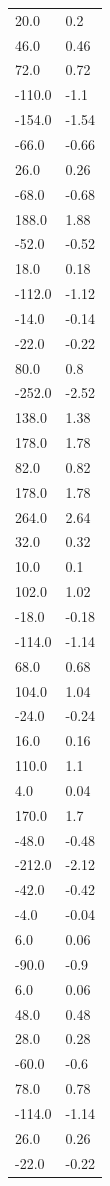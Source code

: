 \begin{longtable}{ll}
20.0 & 0.2 \\
46.0 & 0.46 \\
72.0 & 0.72 \\
-110.0 & -1.1 \\
-154.0 & -1.54 \\
-66.0 & -0.66 \\
26.0 & 0.26 \\
-68.0 & -0.68 \\
188.0 & 1.88 \\
-52.0 & -0.52 \\
18.0 & 0.18 \\
-112.0 & -1.12 \\
-14.0 & -0.14 \\
-22.0 & -0.22 \\
80.0 & 0.8 \\
-252.0 & -2.52 \\
138.0 & 1.38 \\
178.0 & 1.78 \\
82.0 & 0.82 \\
178.0 & 1.78 \\
264.0 & 2.64 \\
32.0 & 0.32 \\
10.0 & 0.1 \\
102.0 & 1.02 \\
-18.0 & -0.18 \\
-114.0 & -1.14 \\
68.0 & 0.68 \\
104.0 & 1.04 \\
-24.0 & -0.24 \\
16.0 & 0.16 \\
110.0 & 1.1 \\
4.0 & 0.04 \\
170.0 & 1.7 \\
-48.0 & -0.48 \\
-212.0 & -2.12 \\
-42.0 & -0.42 \\
-4.0 & -0.04 \\
6.0 & 0.06 \\
-90.0 & -0.9 \\
6.0 & 0.06 \\
48.0 & 0.48 \\
28.0 & 0.28 \\
-60.0 & -0.6 \\
78.0 & 0.78 \\
-114.0 & -1.14 \\
26.0 & 0.26 \\
-22.0 & -0.22 \\

\end{longtable}
